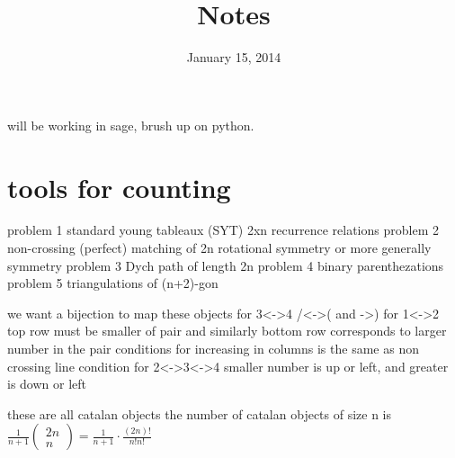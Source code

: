 \documentclass{article}
\begin{document}
\title{Notes}
\date{January 15, 2014}
\maketitle

will be working in sage, brush up on python.

\section*{tools for counting}
problem 1
standard young tableaux (SYT) 2xn
recurrence relations
problem 2
non-crossing (perfect) matching of 2n
rotational symmetry or more generally symmetry
problem 3
Dych path of length 2n
problem 4
binary parenthezations
problem 5
triangulations of (n+2)-gon

we want a bijection to map these objects
for 3<->4 /<->( and \<->)
for 1<->2 top row must be smaller of pair and similarly bottom row corresponds to larger number in the pair
conditions for increasing in columns is the same as non crossing line condition
for 2<->3<->4 smaller number is up or left, and greater is down or left

these are all catalan objects
the number of catalan objects of size n is $\frac{1}{n+1}\left(\begin{array}{c}2n\\n\end{array}\right)=\frac{1}{n+1}\cdot \frac{(2n)!}{n!n!}$
\end{document}
